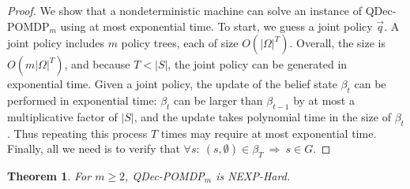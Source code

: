 \documentclass[letterpaper]{article}
\newtheorem{theorem}{Theorem}
\theoremstyle{definition}
\begin{document}
\begin{proof}
We show that a nondeterministic machine can solve an instance of QDec-POMDP$_m$ using at most exponential time.  To start, we guess a joint policy $\vec{q}$.
A joint policy includes $m$ policy trees, each of size $O(|\Omega|^T)$.  Overall, the size is $O(m|\Omega|^T)$, and because $T< |S|$, the joint policy can be generated in exponential time.  Given a joint policy, the update of the belief state $\beta_t$ can be performed in exponential time: $\beta_{t}$ can be larger than $\beta_{t-1}$ by at most a multiplicative factor of $|S|$, and the update takes polynomial time in the size of $\beta_{t}$. Thus repeating this process $T$ times may require at most exponential time.
Finally, all we need is to verify that $ \forall s :~ (s,\emptyset) \in \beta_T ~\Rightarrow~ s \in G $.
\end{proof}

\begin{theorem}
For $m\geq2$, QDec-POMDP$_m$ is NEXP-Hard.
\end{theorem}
\end{document}
